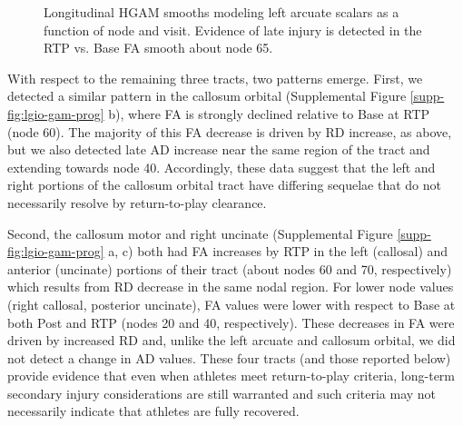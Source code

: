 \documentclass[12pt]{article}
\begin{document}
\begin{figure}[H]
	\centering
	\caption{Longitudinal HGAM smooths modeling left arcuate scalars as a function of node and visit. Evidence of late injury is detected in the RTP vs. Base FA smooth about node 65.}
	\label{fig:lgio-gam-prog}
\end{figure}

With respect to the remaining three tracts, two patterns emerge. First, we detected a similar pattern in the callosum orbital (Supplemental Figure \ref{supp-fig:lgio-gam-prog} b), where FA is strongly declined relative to Base at RTP (node 60). The majority of this FA decrease is driven by RD increase, as above, but we also detected late AD increase near the same region of the tract and extending towards node 40. Accordingly, these data suggest that the left and right portions of the callosum orbital tract have differing sequelae that do not necessarily resolve by return-to-play clearance.

Second, the callosum motor and right uncinate (Supplemental Figure \ref{supp-fig:lgio-gam-prog} a, c) both had FA increases by RTP in the left (callosal) and anterior (uncinate) portions of their tract (about nodes 60 and 70, respectively) which results from RD decrease in the same nodal region. For lower node values (right callosal, posterior uncinate), FA values were lower with respect to Base at both Post and RTP (nodes 20 and 40, respectively). These decreases in FA were driven by increased RD and, unlike the left arcuate and callosum orbital, we did not detect a change in AD values. These four tracts (and those reported below) provide evidence that even when athletes meet return-to-play criteria, long-term secondary injury considerations are still warranted and such criteria may not necessarily indicate that athletes are fully recovered.
\end{document}
